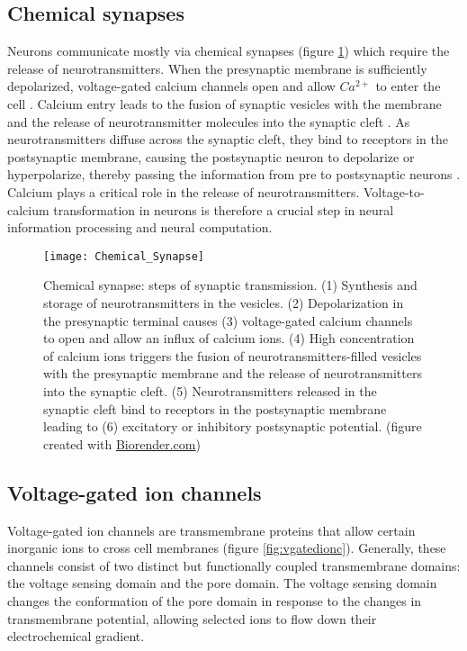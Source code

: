 

\subsection{Chemical synapses}
Neurons communicate mostly via chemical synapses (figure  \ref{fig:chemicalsynapse}) which require the release of neurotransmitters. When the presynaptic membrane is sufficiently depolarized, voltage-gated calcium channels open and allow $Ca^{2+}$ to enter the cell \parencite{Luo2020}. Calcium entry leads to the fusion of synaptic vesicles with the membrane and the release of neurotransmitter molecules into the synaptic cleft \parencite{Chapman2002}.  As neurotransmitters diffuse across the synaptic cleft, they bind to receptors in the postsynaptic membrane, causing the postsynaptic neuron to depolarize or hyperpolarize, thereby passing the information from pre to postsynaptic neurons \parencite{Maio2008}. Calcium plays a critical role in the release of neurotransmitters. Voltage-to-calcium transformation in neurons is therefore a crucial step in neural information processing and neural computation. 

\begin{figure}
\centering
\hspace*{-1cm} 
\texttt{[image: Chemical\_Synapse]}
\caption[Chemical synapse: steps of synaptic transmission] {Chemical synapse: steps of synaptic transmission. (1) Synthesis and storage of neurotransmitters in the vesicles. (2) Depolarization in the presynaptic terminal causes (3) voltage-gated calcium channels to open and allow an influx of calcium ions. (4) High concentration of calcium ions triggers the fusion of neurotransmitters-filled vesicles with the presynaptic membrane and the release of neurotransmitters into the synaptic cleft. (5) Neurotransmitters released in the synaptic cleft bind to receptors in the postsynaptic membrane leading to (6) excitatory or inhibitory postsynaptic potential. (figure created with \href{https://app.biorender.com/biorender-templates}{Biorender.com})}
\label{fig:chemicalsynapse}
\end{figure}

\subsection{Voltage-gated ion channels}
Voltage-gated ion channels are transmembrane proteins that allow certain inorganic ions to cross cell membranes (figure  \ref{fig:vgatedionc}). Generally, these channels consist of two distinct but functionally coupled transmembrane domains: the voltage sensing domain and the pore domain. The voltage sensing domain changes the conformation of the pore domain in response to the changes in transmembrane potential, allowing selected ions to flow down their electrochemical gradient. 

